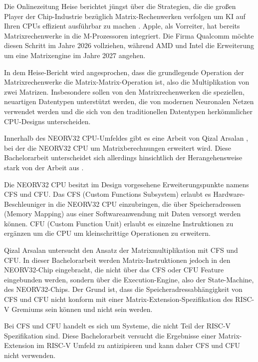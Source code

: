 Die Onlinezeitung Heise berichtet jüngst über die Strategien, die die großen Player der Chip-Industrie bezüglich Matrix-Rechenwerken verfolgen um KI auf Ihren CPUs effizient ausführbar zu machen \cite{heise_matrix_rechenwerke}. Apple, als Vorreiter, hat bereits Matrixrechenwerke in die M-Prozessoren integriert. Die Firma Qualcomm möchte diesen Schritt im Jahre 2026 vollziehen, während AMD und Intel die Erweiterung um eine Matrixengine im Jahre 2027 angehen.

In dem Heise-Bericht \cite{heise_matrix_rechenwerke} wird angesprochen, dass die grundlegende Operation der Matrixrechenwerke die Matrix-Matrix-Operation ist, also die Multiplikation von zwei Matrizen. Insbesondere sollen von den Matrixrechenwerken die speziellen, neuartigen Datentypen unterstützt werden, die von modernen Neuronalen Netzen verwendet werden und die sich von den traditionellen Datentypen herkömmlicher CPU-Designs unterscheiden.

Innerhalb des NEORV32 CPU-Umfeldes gibt es eine Arbeit von Qizal Arsalan \cite{QArsalan_NEORV32_MATRIX_CFU}, bei der die NEORV32 CPU um Matrixberechnungen erweitert wird. Diese Bachelorarbeit unterscheidet sich allerdings hinsichtlich der Herangehensweise stark von der Arbeit aus \cite{QArsalan_NEORV32_MATRIX_CFU}.

Die NEORV32 CPU besitzt im Design vorgesehene Erweiterungspunkte namens CFS und CFU. Das CFS (Custom Functions Subsystem) erlaubt es Hardware-Beschleuniger in die NEORV32 CPU einzubringen, die über Speicheradressen (Memory Mapping) aus einer Softwareanwendung mit Daten versorgt werden können. CFU (Custom Function Unit) erlaubt es einzelne Instruktionen zu ergänzen um die CPU um kleinschrittige Operationen zu erweitern.

Qizal Arsalan untersucht den Ansatz der Matrixmultiplikation mit CFS und CFU. In dieser Bachelorarbeit werden Matrix-Instruktionen jedoch in den NEORV32-Chip eingebracht, die nicht über das CFS oder CFU Feature eingebunden werden, sondern über die Execution-Engine, also der State-Machine, des NEORV32-Chips. Der Grund ist, dass die Speicheradressabhängigkeit von CFS und CFU nicht konform mit einer Matrix-Extension-Spezifikation des RISC-V Gremiums sein können und nicht sein werden.

Bei CFS und CFU handelt es sich um Systeme, die nicht Teil der RISC-V Spezifikation sind. Diese Bachelorarbeit versucht die Ergebnisse einer Matrix-Extension im RISC-V Umfeld zu antizipieren und kann daher CFS und CFU nicht verwenden.